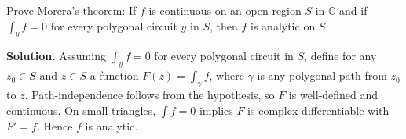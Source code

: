 \begin{problembox}
Prove Morera's theorem: If \( f \) is continuous on an open region \( S \) in \( \mathbb{C} \) and if \( \int_y f = 0 \) for every polygonal circuit \( y \) in \( S \), then \( f \) is analytic on \( S \).
\end{problembox}

\noindent\textbf{Solution.}
Assuming $\int_y f=0$ for every polygonal circuit in $S$, define for any $z_0\in S$ and $z\in S$ a function $F(z)=\int_{\gamma} f$, where $\gamma$ is any polygonal path from $z_0$ to $z$. Path-independence follows from the hypothesis, so $F$ is well-defined and continuous. On small triangles, $\int f=0$ implies $F$ is complex differentiable with $F'=f$. Hence $f$ is analytic.
